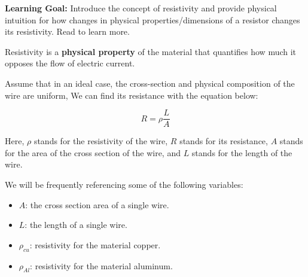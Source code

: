 
\textbf{Learning Goal:} Introduce the concept of resistivity and provide physical intuition for how changes in physical properties/dimensions of a resistor changes its resistivity. Read  to learn more.


Resistivity is a \textbf{physical property} of the material that quantifies how much it opposes the flow of electric current.

Assume that in an ideal case, the cross-section and physical composition of the wire are uniform, We can find its resistance with the equation below:

$$R = \rho \frac{L}{A}$$

Here, $\rho$ stands for the resistivity of the wire, $R$ stands for its resistance, $A$ stands for the area of the cross section of the wire, and $L$ stands for the length of the wire. 


We will be frequently referencing some of the following variables:
\begin{itemize}
    \item $A$: the cross section area of a single wire.
    \item $L$: the length of a single wire.
    \item $\rho_{cu}$: resistivity for the material copper.
    \item $\rho_{Al}$: resistivity for the material aluminum.
\end{itemize}


